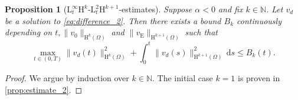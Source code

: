 \documentclass[preprint]{elsarticle}
\newtheorem{prop}[prop]{Proposition}
\numberwithin{equation}{section}
\newcommand {\N}	{\mathbb{N}}
\renewcommand{\d}{\, \mathrm{d}}
\renewcommand{\H}{\mathrm{H}}
\newcommand{\rL}{\mathrm{L}}
\newcommand{\rH}{\H}
\newcommand{\rE}{\mathrm{E}}
\begin{document}
\begin{prop}[$\rL^\infty_t\rH^k$-$\rL^2_t \rH^{k+1}$-estimates]\label{prop:estimate_2 Hk}
	Suppose $\alpha < 0$ %
	and fix $k \in \N$. %
	Let $v_d$ be a solution to \eqref{eq:difference_2}. Then there exists a bound $B_k$ continuously depending on $t, \| v_0 \|_{\rH^k(\Omega)}$ and $\| v_{\rE} \|_{\rH^{k+1}(\Omega)}$ such that 
	\begin{equation*}
		\max_{t \in (0,T)} \| v_d(t) \|_{\rH^k(\Omega)}^2
		+ \int_0^t \| v_d(s) \|_{\rH^{k+1}(\Omega)}^2 \d s \leq B_k(t) .
	\end{equation*}
\end{prop}
\begin{proof}
	We argue by induction over $k \in \N$.
	The initial case $k = 1$ is proven in \autoref{prop:estimate_2}. 
	

\end{proof}
\end{document}
